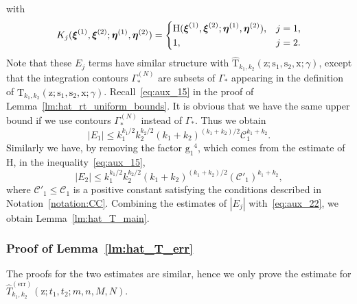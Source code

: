 \documentclass{article}
\numberwithin{equation}{section}
\newcommand{\CC}{\mathcal{C}}
\newcommand{\exe}{\mathrm{err}}
\begin{document}
with
\begin{equation}
	K_j(\boldsymbol{\xi}^{(1)},\boldsymbol{\xi}^{(2)};
	\boldsymbol{\eta}^{(1)},\boldsymbol{\eta}^{(2)})=
	\begin{dcases}
		\mathrm{H}(\boldsymbol{\xi}^{(1)},\boldsymbol{\xi}^{(2)};
		\boldsymbol{\eta}^{(1)},\boldsymbol{\eta}^{(2)}), & j=1,\\
		1,& j=2.
	\end{dcases}
\end{equation}
Note that these $E_j$ terms have similar structure with $\mathrm{\hat T}_{k_1,k_2}(\mathrm{z};\mathrm{s}_1,\mathrm{s}_2,\mathrm{x};\gamma)$, except that the integration contours $\Gamma_*^{(N)}$ are subsets of $\Gamma_*$ appearing in the definition of $\mathrm{\hat T}_{k_1,k_2}(\mathrm{z};\mathrm{s}_1,\mathrm{s}_2,\mathrm{x};\gamma)$. Recall~\eqref{eq:aux_15} in the proof of Lemma~\ref{lm:hat_rt_uniform_bounds}. It is obvious that we have the same upper bound if we use  contours $\Gamma_*^{(N)}$  instead of $\Gamma_*$. Thus we obtain
\begin{equation*}
	|E_1| \le k_1^{k_1/2}k_2^{k_2/2}(k_1+k_2)^{(k_1+k_2)/2}\CC_{1}^{k_1+k_2}.
\end{equation*}
Similarly we have, by removing the factor $\mathrm{g_1}^4$, which comes from the estimate of $\mathrm{H}$, in the inequality~\eqref{eq:aux_15}, 
\begin{equation*}
	|E_2| \le k_1^{k_1/2}k_2^{k_2/2}(k_1+k_2)^{(k_1+k_2)/2}(\CC'_{1})^{k_1+k_2},
\end{equation*}
where $\CC'_1\le \CC_1$ is a positive constant satisfying the conditions described in Notation~\ref{notation:CC}. Combining the estimates of $|E_j|$ with~\eqref{eq:aux_22}, we obtain Lemma~\ref{lm:hat_T_main}.

\subsubsection{Proof of Lemma~\ref{lm:hat_T_err}}

The proofs for the two estimates are similar, hence we only prove the estimate for $\hat T_{k_1,k_2}^{(\exe)}(\mathrm{z};t_1,t_2;m,n,M,N)$.
\end{document}
